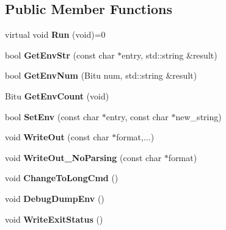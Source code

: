 \subsection*{Public Member Functions}
\begin{DoxyCompactItemize}
\item 
\hypertarget{classProgram_acd37c94c3c12a55650a05ee1449aa176}{virtual void {\bfseries Run} (void)=0}\label{classProgram_acd37c94c3c12a55650a05ee1449aa176}

\item 
\hypertarget{classProgram_a0012adb877f24b04d836a37ab48f2c60}{bool {\bfseries Get\-Env\-Str} (const char $\ast$entry, std\-::string \&result)}\label{classProgram_a0012adb877f24b04d836a37ab48f2c60}

\item 
\hypertarget{classProgram_a58d316ec88ff44eff5188f46ef7eefd8}{bool {\bfseries Get\-Env\-Num} (Bitu num, std\-::string \&result)}\label{classProgram_a58d316ec88ff44eff5188f46ef7eefd8}

\item 
\hypertarget{classProgram_a67b647d573493de3f7237fe075a8532d}{Bitu {\bfseries Get\-Env\-Count} (void)}\label{classProgram_a67b647d573493de3f7237fe075a8532d}

\item 
\hypertarget{classProgram_a8a7d72f5c08f644fb19e5f36dc1c3d46}{bool {\bfseries Set\-Env} (const char $\ast$entry, const char $\ast$new\-\_\-string)}\label{classProgram_a8a7d72f5c08f644fb19e5f36dc1c3d46}

\item 
\hypertarget{classProgram_af3326c2431db683c8cbfcf1a4eb06f71}{void {\bfseries Write\-Out} (const char $\ast$format,...)}\label{classProgram_af3326c2431db683c8cbfcf1a4eb06f71}

\item 
\hypertarget{classProgram_aa45498c7e07ec784b72ed166ab69a847}{void {\bfseries Write\-Out\-\_\-\-No\-Parsing} (const char $\ast$format)}\label{classProgram_aa45498c7e07ec784b72ed166ab69a847}

\item 
\hypertarget{classProgram_a3b124865b50f681fa1d5ae05d71107f8}{void {\bfseries Change\-To\-Long\-Cmd} ()}\label{classProgram_a3b124865b50f681fa1d5ae05d71107f8}

\item 
\hypertarget{classProgram_a7a253f9ce31472b4b5c38791524f3ba8}{void {\bfseries Debug\-Dump\-Env} ()}\label{classProgram_a7a253f9ce31472b4b5c38791524f3ba8}

\item 
\hypertarget{classProgram_ab1fa236943ef14b02c59bc4225d216a1}{void {\bfseries Write\-Exit\-Status} ()}\label{classProgram_ab1fa236943ef14b02c59bc4225d216a1}

\end{DoxyCompactItemize}
